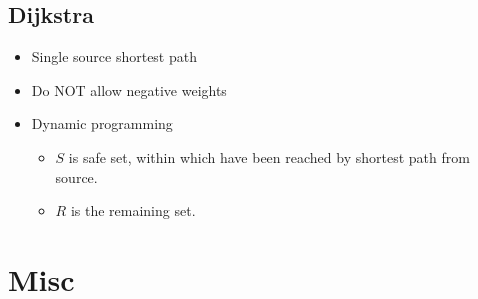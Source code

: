 \documentclass[twocolumn]{article}
\begin{document}
\subsection{Dijkstra}
\begin{itemize}
\item Single source shortest path
\item Do NOT allow negative weights
\item Dynamic programming
  \begin{itemize}
  \item $S$ is safe set, within which have been reached by shortest path from source.
  \item $R$ is the remaining set.
  \end{itemize}
\end{itemize}


\section{Misc}


\end{document}
